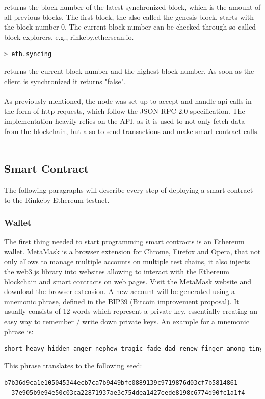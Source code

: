 returns the block number of the latest synchronized block, which is the amount of all previous blocks.
The first block, the also called the genesis block, starts with the block number 0.
The current block number can be checked through so-called block explorers, e.g., {rinkeby.etherscan.io}.
\\
\begin{lstlisting}[language=bash, numbers=none]
  > eth.syncing
\end{lstlisting}
returns the current block number and the highest block number.
As soon as the client is synchronized it returns "false"\cite{javascript-0.20}.
\\\\
As previously mentioned, the node was set up to accept and handle api calls in the form of http requests, which follow the JSON-RPC 2.0 specification\cite{json-rpc-spec}.
The implementation heavily relies on the API, as it is used to not only fetch data from the blockchain, but also to send transactions and make smart contract calls\cite{json-rpc}\cite{management-apis}.
\\\\
\subsection{Smart Contract}
The following paragraphs will describe every step of deploying a smart contract to the Rinkeby Ethereum testnet.
\\ 
\subsubsection{Wallet}
The first thing needed to start programming smart contracts is an Ethereum wallet.
MetaMask is a browser extension for Chrome, Firefox and Opera, that not only allows to manage multiple accounts on multiple test chains, it also injects the web3.js library into websites allowing to interact with the Ethereum blockchain and smart contracts on web pages.
Visit the MetaMask\cite{metamask} website and download the browser extension.
A new account will be generated using a mnemonic phrase, defined in the BIP39 (Bitcoin improvement proposal)\cite{bip39}.
It usually consists of 12 words which represent a private key, essentially creating an easy way to remember / write down private keys.
An example for a mnemonic phrase is:
\begin{lstlisting}[language=bash, numbers=none]
  short heavy hidden anger nephew tragic fade dad renew finger among tiny
\end{lstlisting}
This phrase translates to the following seed:
\begin{lstlisting}[language=bash, numbers=none]
  b7b36d9ca1e105045344ecb7ca7b9449bfc0889139c9719876d03cf7b5814861
  37e905b9e94e50c03ca22871937ae3c754dea1427eede8198c6774d90fc1a1f4
\end{lstlisting}

